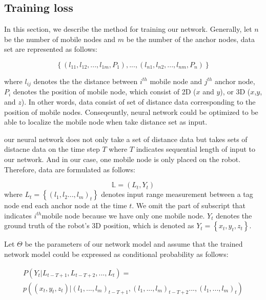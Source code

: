 \documentclass{ieeeaccess}
\begin{document}
\subsection{Training loss}

  In this section, we describe the method for training our network. Generally, let $n$ be the number of mobile nodes and $m$ be the number of the anchor nodes, data set are represented as follows:
  
  \begin{equation}
  \left\{(l_{11}, l_{12}, ..., l_{1m}, P_1),...,(l_{n1}, l_{n2}, ..., l_{nm}, P_n)\right\}
  \end{equation} 
  
  
 where $l_{ij}$ denotes the the distance between $i^{th}$ mobile node and $j^{th}$ anchor node, $P_i$ denotes the position of mobile node, which consist of 2D ($x$ and $y$), or 3D ($x$,$y$, and $z$). 
 In other words, data consist of set of distance data corresponding to the position of mobile nodes. Conseqeuntly, neural network  could be optimized to be able to localize the mobile node when take distance set as input.
 

 
 our neural network does not only take a set of distance data but takes sets of distacne data on the time step $T$ where $T$ indicates sequential length of input to our network. And in our case, one mobile node is only placed on the robot. Therefore, data are formulated as follows:
 
 \begin{equation}
 \mathbb{L} = {(L_t, Y_t)} 
 \end{equation}
 where $L_t = \left\{(l_1, l_2... , l_m)_t\right\}$ denotes input range measurement between a tag node end each anchor node at the time $t$. We omit the part of subscript that indicates $i^{th}$mobile node because we have only one mobile node. $Y_t$ denotes the ground truth of the robot's 3D position, which is denoted as $Y_t = \left\{x_t, y_t, z_t\right\}$.
 
 Let $\Theta$ be the parameters of our network model and assume that the trained network model could be expressed as conditional probability as follows:

\begin{multline}
 P(Y_t|L_{t-T+1}, L_{t-T+2},..., L_t) =\\
 p((x_t, y_t, z_t)|(l_1,..., l_m)_{t-T+1},(l_1,..., l_m)_{t-T+2}..., (l_1,..., l_m)_t)
\end{multline}  
\end{document}
